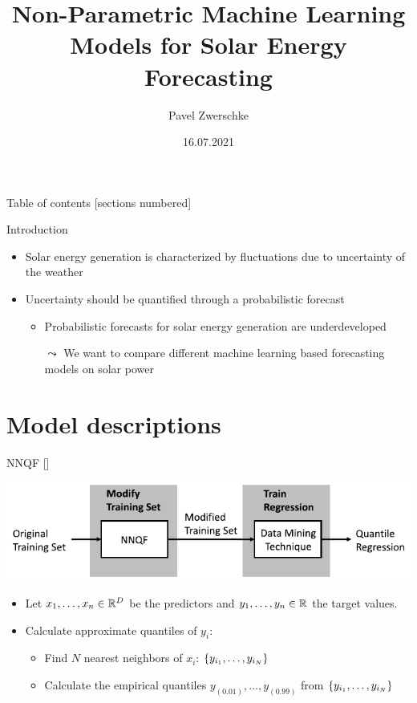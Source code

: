 \documentclass[10pt,aspectratio=169]{beamer}
\title{Non-Parametric Machine Learning Models for Solar Energy Forecasting}
\date{16.07.2021}
\author{Pavel Zwerschke}
\institute{Karlsruhe Institute of Technology}
\begin{document}
\maketitle

\begin{frame}{Table of contents}
    [sections numbered]
    \tableofcontents%
\end{frame}

\begin{frame}{Introduction}
    \begin{itemize}
        \item Solar energy generation is characterized by fluctuations due to uncertainty of the weather
        \item Uncertainty should be quantified through a probabilistic forecast
        \begin{itemize}
            \item Probabilistic forecasts for solar energy generation are underdeveloped
            \item[\(\leadsto\)] We want to compare different machine learning based forecasting models on solar power
        \end{itemize}
    \end{itemize}
\end{frame}

\section{Model descriptions}

\begin{frame}{NNQF [\cite{Ordiano2019}]}
    \begin{center}
        \includegraphics{plots/nnqf_approach.pdf}
    \end{center}
    \begin{itemize}
        \item Let \(x_1, \ldots, x_n \in \mathbb{R}^D\) be the predictors and \(y_1, \ldots, y_n\in \mathbb{R}\) the target values.
        \item Calculate approximate quantiles of \(y_i\):
        \begin{itemize}
            \item Find \(N\) nearest neighbors of \(x_i\): \(\{y_{i_1}, \ldots, y_{i_N}\}\)
            \item Calculate the empirical quantiles \(y_{(0.01)}, \ldots, y_{(0.99)}\) from \(\{y_{i_1}, \ldots, y_{i_N}\}\)
        \end{itemize}
    \end{itemize}
\end{frame}
\end{document}
